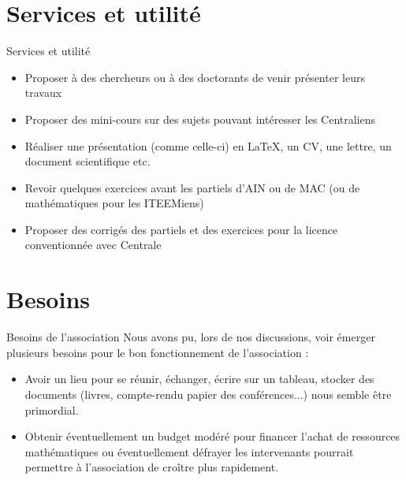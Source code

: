 \documentclass{beamer}
\begin{document}
\section{Services et utilité}
\begin{frame}{Services et utilité}  
  \begin{itemize}
    \item Proposer à des chercheurs ou à des doctorants de venir présenter leurs travaux
    \item Proposer des mini-cours sur des sujets pouvant intéresser les Centraliens
  \end{itemize}

  \begin{itemize}
    \item Réaliser une présentation (comme celle-ci) en \LaTeX, un CV, une lettre, un document scientifique etc.
  \end{itemize}

  \begin{itemize}
    \item Revoir quelques exercices avant les partiels d'AIN ou de MAC (ou de mathématiques pour les ITEEMiens)
    \item Proposer des corrigés des partiels et des exercices pour la licence conventionnée avec Centrale
  \end{itemize}

\end{frame}

\section{Besoins}
\begin{frame}{Besoins de l'association}
  Nous avons pu, lors de nos discussions, voir émerger plusieurs besoins pour le bon fonctionnement de l'association :
  \begin{itemize}
    \item Avoir un lieu pour se réunir, échanger, écrire sur un tableau, stocker des documents (livres, compte-rendu papier des conférences...) nous semble être primordial. 
    \item Obtenir éventuellement un budget modéré pour financer l'achat de ressources mathématiques ou éventuellement défrayer les intervenants pourrait permettre à l'association de croître plus rapidement.
  \end{itemize}
\end{frame}

  
\end{document}
